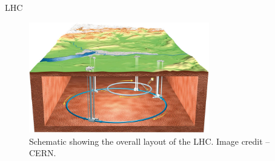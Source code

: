 \documentclass[aspectratio=169]{beamer}
\begin{document}
\begin{backup}

\begin{frame}{LHC}
    \begin{figure}
      \centering
      \includegraphics[width=0.7\textwidth]{../figures/experiment/lhc-schematic.png}
      \caption{Schematic showing the overall layout of the LHC. Image credit -- CERN.}
    \end{figure}
\end{frame}

\end{backup}
\end{document}
